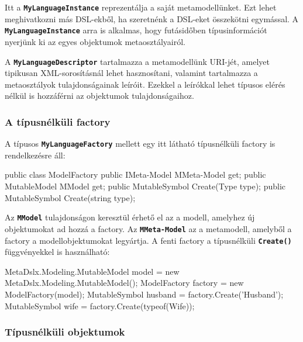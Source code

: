 \documentclass[12pt, a4paper]{report}
\newcommand{\ff}[1]{\textbf{\texttt{#1}}}
\begin{document}
Itt a \ff{MyLanguageInstance} reprezentálja a saját metamodellünket. Ezt lehet meghivatkozni más DSL-ekből, ha szeretnénk a DSL-eket összekötni egymással. A \ff{MyLanguageInstance} arra is alkalmas, hogy futásidőben típusinformációt nyerjünk ki az egyes objektumok metaosztályairól.

A \ff{MyLanguageDescriptor} tartalmazza a metamodellünk URI-jét, amelyet tipikusan XML-sorosításnál lehet hasznosítani, valamint tartalmazza a metaosztályok tulajdonságainak leíróit. Ezekkel a leírókkal lehet típusos elérés nélkül is hozzáférni az objektumok tulajdonságaihoz.

\subsubsection{A típusnélküli factory}

A típusos \ff{MyLanguageFactory} mellett egy itt látható típusnélküli factory is rendelkezésre áll:

\begin{csharpcode}
public class ModelFactory
{
	public IMeta-Model MMeta-Model { get; }
	public MutableModel MModel { get; }
	public MutableSymbol Create(Type type);
	public MutableSymbol Create(string type);
}
\end{csharpcode}

Az \ff{MModel} tulajdonságon keresztül érhető el az a modell, amelyhez új objektumokat ad hozzá a factory. Az \ff{MMeta-Model} az a metamodell, amelyből a factory a modellobjektumokat legyártja. A fenti factory a típusnélküli \ff{Create()} függvényekkel is használható:
\begin{csharpcode}
MetaDslx.Modeling.MutableModel model = new MetaDslx.Modeling.MutableModel();
ModelFactory factory = new ModelFactory(model);
MutableSymbol husband = factory.Create('Husband');
MutableSymbol wife = factory.Create(typeof(Wife));
\end{csharpcode}

\subsubsection{Típusnélküli objektumok}
\end{document}
